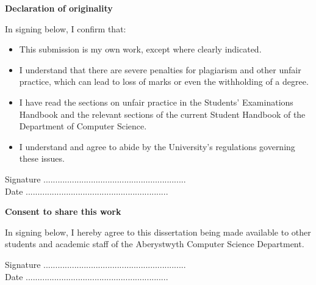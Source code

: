 \thispagestyle{empty}

\begin{center}
    {\LARGE\bf Declaration of originality}
\end{center}

In signing below, I confirm that:

\begin{itemize}
\item{This submission is my own work, except where clearly
indicated.  }

\item{I understand that there are severe penalties for plagiarism
and other unfair practice, which can lead to loss of marks
or even the withholding of a degree. }

\item{I have read the sections on unfair practice in the Students'
Examinations Handbook and the relevant sections of the
current Student Handbook of the Department of Computer
Science.}

\item{I understand and agree to abide by the University's
regulations governing these issues.}
\end{itemize}

\vspace{3em}
Signature ............................................................  \\

\vspace{1em}
Date ............................................................ \\

\vspace{5em}
\begin{center}
    {\LARGE\bf Consent to share this work}
\end{center}

In signing below, I hereby agree to this dissertation being made available to other
students and academic staff of the Aberystwyth Computer Science Department.

\vspace{3em}
Signature ............................................................  \\

\vspace{1em}
Date ............................................................ \\

